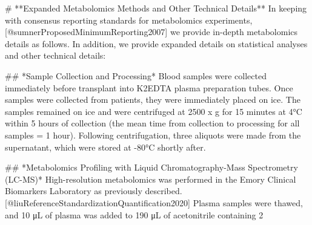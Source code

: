 # **Expanded Metabolomics Methods and Other Technical Details**
In keeping with consensus reporting standards for metabolomics experiments,[@sumnerProposedMinimumReporting2007] we provide in-depth metabolomics details as follows. In addition, we provide expanded details on statistical analyses and other technical details:

## *Sample Collection and Processing*
Blood samples were collected immediately before transplant into K2EDTA plasma preparation tubes. Once samples were collected from patients, they were immediately placed on ice. The samples remained on ice and were centrifuged at 2500 x g for 15 minutes at 4°C within 5 hours of collection (the mean time from collection to processing for all samples = 1 hour). Following centrifugation, three aliquots were made from the supernatant, which were stored at -80°C shortly after.

## *Metabolomics Profiling with Liquid Chromatography-Mass Spectrometry (LC-MS)*
High-resolution metabolomics was performed in the Emory Clinical Biomarkers Laboratory as previously described.[@liuReferenceStandardizationQuantification2020] Plasma samples were thawed, and 10 μL of plasma was added to 190 μL of acetonitrile containing 2%

